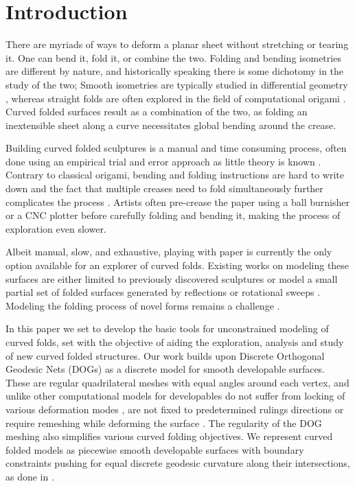 \section{Introduction}
There are myriads of ways to deform a planar sheet without stretching or tearing it. One can bend it, fold it, or combine the two. Folding and bending isometries are different by nature, and historically speaking there is some dichotomy in the study of the two; Smooth isometries are typically studied in differential geometry \cite{do_carmo}, whereas straight folds are often explored in the field of computational origami \cite{origami_book}. Curved folded surfaces \cite{huffman} result as a combination of the two, as folding an inextensible sheet along a curve necessitates global bending around the crease.

Building curved folded sculptures is a manual and time consuming process, often done using an empirical trial and error approach  as little theory is known \cite{curved_review,huffmann_reconstructing}. Contrary to classical origami, bending and folding instructions are hard to write down and the fact that multiple creases need to fold simultaneously further complicates the process \cite{StringActuated:2017}. Artists often pre-crease the paper using a ball burnisher or a CNC plotter before carefully folding and bending it, making the process of exploration even slower. 

Albeit manual, slow, and exhaustive, playing with paper is currently the only option available for an explorer of curved folds. Existing works on modeling these surfaces are either limited to previously discovered sculptures \cite{curved_folding_kilian,StringActuated:2017} or model a small partial set of folded surfaces generated by reflections or rotational sweeps \cite{Mitani_ref,mitani2009design}. Modeling the folding process of novel forms remains a challenge \cite{curved_review}. 

In this paper we set to develop the basic tools for unconstrained modeling of curved folds, set with the objective of aiding the exploration, analysis and study of new curved folded structures. Our work builds upon Discrete Orthogonal Geodesic Nets (DOGs) \cite{rabi18,rabi2018shape} as a discrete model for smooth developable surfaces. These are regular quadrilateral meshes with equal angles around each vertex, and unlike other computational models for developables do not suffer from locking of various deformation modes \cite{locking1,locking2,grin_shells}, are not fixed to predetermined rulings directions \cite{pottmann_new,curved_folding_kilian} or require remeshing while deforming the surface \cite{StringActuated:2017,SchreckEG2017,Narain}. The regularity of the DOG meshing also simplifies various curved folding objectives. We represent curved folded models as piecewise smooth developable surfaces with boundary constraints pushing for equal discrete geodesic curvature along their intersections, as done in \cite{rabi2018shape}.

